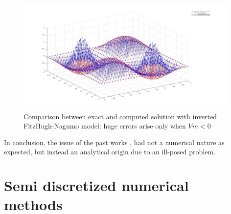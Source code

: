 \documentclass[a4paper,11pt]{article}
\begin{document}
\begin{figure}[h]
	\begin{center}
		\includegraphics[width = 11cm]{./sol_ill_posed.jpg}
		\caption{Comparison between exact and computed solution with inverted FitzHugh-Nagumo model: huge errors arise only when $Vm<0$}
		\label{sol_ill_posed}
	\end{center}
\end{figure}
    
    \noindent In conclusion, the issue of the past works \cite{andreotti}, \cite{marta} had not a numerical nature as expected, but instead an analytical origin due to an ill-posed problem.

\newpage

    \section{Semi discretized numerical methods}
\end{document}
